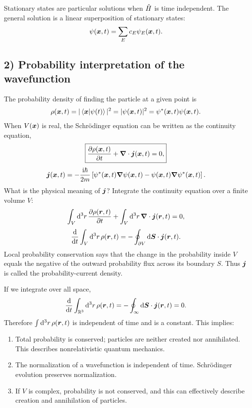 Stationary states are particular solutions when $\hat{H}$ is time independent. The general solution is a linear superposition of stationary states:
\begin{equation}
\psi(\bm{x},t)=\sum_Ec_E\psi_E(\bm{x},t).
\end{equation}

\subsection*{2) Probability interpretation of the wavefunction}
The probability density of finding the particle at a given point is
\begin{equation}
\rho(\bm{x},t)=|\left\langle\bm{x}\middle|\psi(t)\right\rangle|^2
=|\psi(\bm{x},t)|^2=\psi^*(\bm{x},t)\psi(\bm{x},t).
\end{equation}
When $V(\bm{x})$ is real, the Schr\"odinger equation can be written as the continuity equation,
\begin{equation}
\boxed{\frac{\partial\rho(\bm{x},t)}{\partial t}
+\bm{\nabla}\cdot\bm{j}(\bm{x},t)=0,}
\end{equation}
\begin{equation}
\bm{j}(\bm{x},t)=-\frac{\mathrm{i}\hbar}{2m}
\left[\psi^*(\bm{x},t)\bm{\nabla}\psi(\bm{x},t)
-\psi(\bm{x},t)\bm{\nabla}\psi^*(\bm{x},t)\right].
\end{equation}
What is the physical meaning of $\bm{j}$? Integrate the continuity equation over a finite volume $V$:
\begin{equation}
\int_V\mathrm{d}^3r\,\frac{\partial\rho(\bm{r},t)}{\partial t}
+\int_V\mathrm{d}^3r\,\bm{\nabla}\cdot\bm{j}(\bm{r},t)=0,
\end{equation}
\begin{equation}
\frac{\mathrm{d}}{\mathrm{d} t}\int_V\mathrm{d}^3r\,\rho(\bm{r},t)
=-\oint_{\partial V}\mathrm{d}\bm{S}\cdot\bm{j}(\bm{r},t).
\end{equation}
Local probability conservation says that the change in the probability inside $V$ equals the negative of the outward probability flux across its boundary $S$. Thus $\bm{j}$ is called the probability-current density.

If we integrate over all space,
\begin{equation}
\frac{\mathrm{d}}{\mathrm{d} t}\int_{\mathbb R^3}\mathrm{d}^3r\,\rho(\bm{r},t)
=-\oint_{\infty}\mathrm{d}\bm{S}\cdot\bm{j}(\bm{r},t)=0.
\end{equation}
Therefore $\int\mathrm{d}^3r\,\rho(\bm{r},t)$ is independent of time and is a constant. This implies:
\begin{enumerate}[label=\alph*)]
\item Total probability is conserved; particles are neither created nor annihilated. This describes nonrelativistic quantum mechanics.
\item The normalization of a wavefunction is independent of time. Schr\"odinger evolution preserves normalization.
\item If $V$ is complex, probability is not conserved, and this can effectively describe creation and annihilation of particles.
\end{enumerate}

